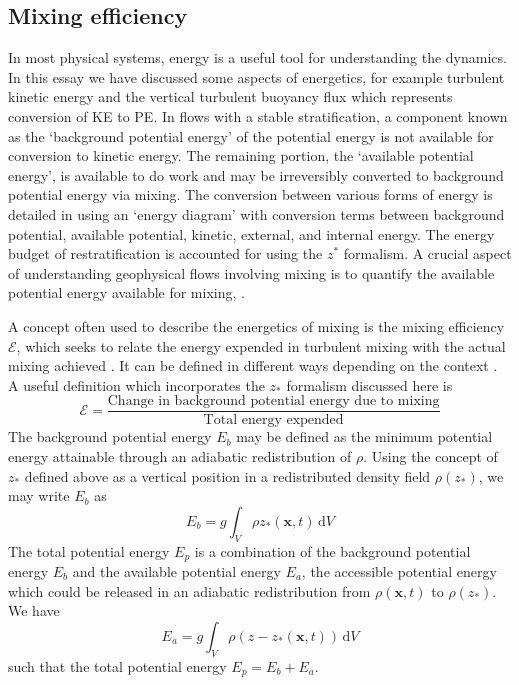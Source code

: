 \documentclass[a4paper]{article}
\begin{document}
\subsection{Mixing efficiency}
\label{sec:energetics}

In most physical systems, energy is a useful tool for understanding the dynamics. In this essay we have
discussed some aspects of energetics, for example turbulent kinetic energy and the vertical turbulent buoyancy
flux which represents conversion of KE to PE. In flows with a stable stratification, a component known as the
`background potential energy' of the potential energy is not available for conversion to kinetic energy. The
remaining portion, the `available potential energy', is available to do work and may be irreversibly converted
to background potential energy via mixing. The conversion between various forms of energy is
detailed in \citet{winters1995} using an `energy diagram' with conversion terms between background
potential, available potential, kinetic, external, and internal energy. The energy budget of restratification
is accounted for using the $z^*$ formalism. A crucial aspect of understanding geophysical flows involving
mixing is to quantify the available potential energy available for mixing, . 

A concept often used to describe the energetics of mixing is the mixing efficiency $\mathcal{E}$,
which seeks to relate the energy expended in turbulent mixing with the actual mixing achieved
\citep{wykes2015}. It can be defined in different ways depending on the context \citep{gregg2018}. A useful
definition which incorporates the $z_*$ formalism discussed here is
\begin{equation}
	\mathcal{E} = \frac{\text{Change in background potential energy due to mixing}}{\text{Total energy expended}}
\end{equation}
The background potential energy $E_b$ may be defined as the minimum potential energy attainable through an
adiabatic redistribution of $\rho$. Using the concept of $z_*$ defined above as a vertical position in a
redistributed density field $\rho(z_*)$, we may write $E_b$ as
\begin{equation}
	E_b = g \int_V \rho z_*(\bm{x},t)\,\mathrm{d}V
\end{equation}
The total potential energy $E_p$ is a combination of the background potential energy $E_b$ and the
available potential energy $E_a$, the accessible potential energy which could be released in an adiabatic
redistribution from $\rho(\bm{x},t)$ to $\rho(z_*)$. We have
\begin{equation}
	E_a = g \int_V \rho \left(z-z_*(\bm{x},t)\right)\,\mathrm{d}V
\end{equation}
such that the total potential energy $E_p = E_b + E_a$. 
\end{document}
